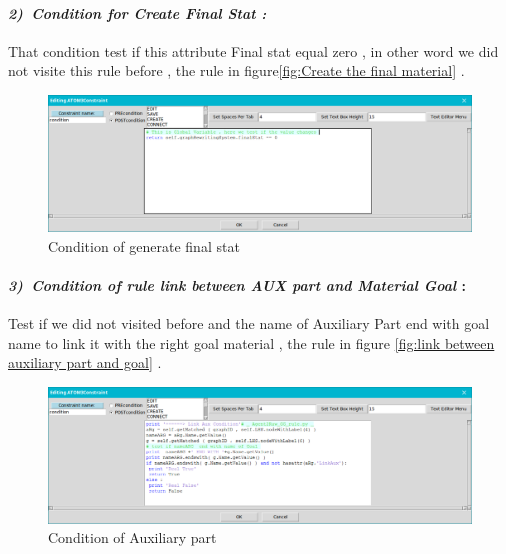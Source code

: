 \paragraph{\emph{2)~Condition for Create Final Stat : } } 
That condition test if this attribute Final stat equal zero 
, in other word we did not visite this rule before , the rule in figure\ref{fig:Create the final material} .
 
 
\begin{figure}[th]
	\centering
 	\includegraphics[scale=0.8]{Chapiter3/img/condfinal}
	\caption{\label{fig:Condition of generate final stat } Condition of generate final stat }
\end{figure} 
 

\paragraph{\emph{3)~Condition of rule link between AUX part and Material Goal } : }
  
 
Test if we did not visited before  and the name of Auxiliary Part end with goal name to link it with the right goal material , the rule in figure \ref{fig:link between auxiliary part and goal}  .
 
 
 
\begin{figure}[th]
	\centering
 	\includegraphics[scale=0.8]{Chapiter3/img/condaux}
	\caption{\label{fig:Condition of Auxiliary part}Condition of Auxiliary part  }
\end{figure} 





\pagebreak
